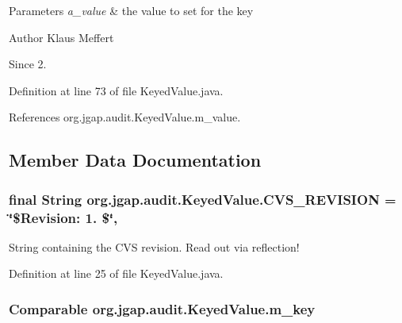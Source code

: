 \begin{DoxyParams}{Parameters}
{\em a\-\_\-value} & the value to set for the key\\
\hline
\end{DoxyParams}
\begin{DoxyAuthor}{Author}
Klaus Meffert 
\end{DoxyAuthor}
\begin{DoxySince}{Since}
2. 
\end{DoxySince}


Definition at line 73 of file Keyed\-Value.\-java.



References org.\-jgap.\-audit.\-Keyed\-Value.\-m\-\_\-value.



\subsection{Member Data Documentation}
\hypertarget{classorg_1_1jgap_1_1audit_1_1_keyed_value_a4d6139f94a6cd1434621eaf28e15f45d}{
\subsubsection[{C\-V\-S\-\_\-\-R\-E\-V\-I\-S\-I\-O\-N}]{\setlength{\rightskip}{0pt plus 5cm}final String org.\-jgap.\-audit.\-Keyed\-Value.\-C\-V\-S\-\_\-\-R\-E\-V\-I\-S\-I\-O\-N = \char`\"{}\$Revision\-: 1. \$\char`\"{}\hspace{0.3cm}{\ttfamily [static]}, {\ttfamily [private]}}}\label{classorg_1_1jgap_1_1audit_1_1_keyed_value_a4d6139f94a6cd1434621eaf28e15f45d}
String containing the C\-V\-S revision. Read out via reflection! 

Definition at line 25 of file Keyed\-Value.\-java.

\hypertarget{classorg_1_1jgap_1_1audit_1_1_keyed_value_aeb5216693d66e984ff3e0f30194a37c2}{
\subsubsection[{m\-\_\-key}]{\setlength{\rightskip}{0pt plus 5cm}Comparable org.\-jgap.\-audit.\-Keyed\-Value.\-m\-\_\-key\hspace{0.3cm}{\ttfamily [private]}}}\label{classorg_1_1jgap_1_1audit_1_1_keyed_value_aeb5216693d66e984ff3e0f30194a37c2}


